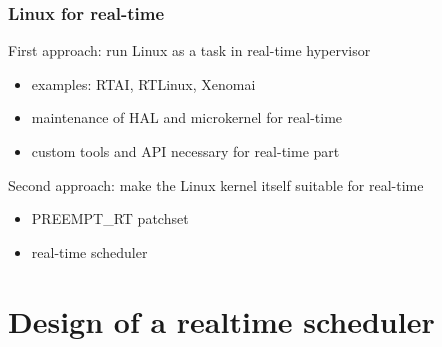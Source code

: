 \documentclass[aspectratio=1610,xcolor=svgnames]{beamer}
\begin{document}
\begin{frame}\frametitle{Linux for real-time}
  First approach: run Linux as a task in real-time hypervisor
  \begin{itemize}
  \item examples: RTAI, RTLinux, Xenomai
  \item maintenance of HAL and microkernel for real-time
  \item custom tools and API necessary for real-time part 
  \end{itemize}

  \pause

  Second approach: make the Linux kernel itself suitable for real-time
  \begin{itemize}
  \item PREEMPT\_RT patchset
  \item<3-> \alert{real-time scheduler}
  \end{itemize}
\end{frame}

\section{Design of a realtime scheduler}




\end{document}
